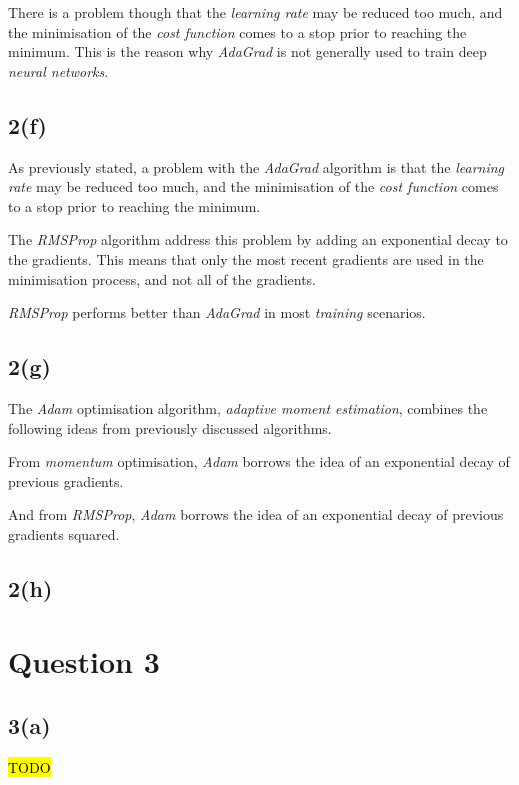 \documentclass[12pt, a4paper,reqno]{article}
\begin{document}
There is a problem though that the \emph{learning rate} may be reduced too much, and the minimisation of the \emph{cost function} comes to a stop prior to reaching the minimum. This is the reason why \emph{AdaGrad} is not generally used to train deep \emph{neural networks}.
 
\subsection*{2(f)}

As previously stated, a problem with the \emph{AdaGrad} algorithm is that the \emph{learning rate} may be reduced too much, and the minimisation of the \emph{cost function} comes to a stop prior to reaching the minimum.

The \emph{RMSProp} algorithm address this problem by adding an exponential decay to the gradients. This means that only the most recent gradients are used in the minimisation process, and not all of the gradients.

\emph{RMSProp} performs better than \emph{AdaGrad} in most \emph{training} scenarios.

\subsection*{2(g)}

The \emph{Adam} optimisation algorithm, \emph{adaptive moment estimation}, combines the following ideas from previously discussed algorithms.

From \emph{momentum} optimisation, \emph{Adam} borrows the idea of an exponential decay of previous gradients.

And from \emph{RMSProp}, \emph{Adam} borrows the idea of an exponential decay of previous gradients squared.

\subsection*{2(h)}


%
%
\clearpage\section*{Question 3}

\subsection*{3(a)}
\hl{TODO}
\end{document}
